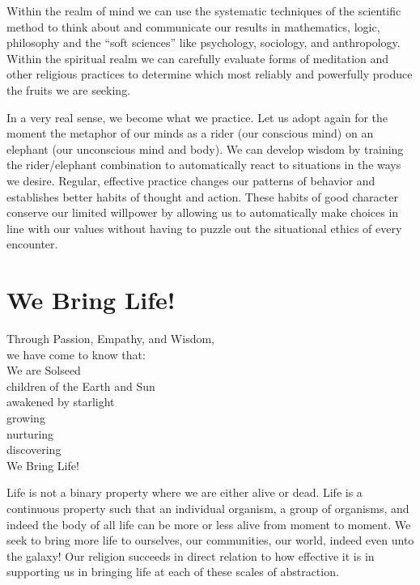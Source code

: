 \documentclass[ebook,12pt,openany,twoside]{memoir}
\newcommand{\tab}{\hspace*{2em}}
\newcommand{\imagefacingchapter}[1]{
  \cleartoverso
  \clearpage \null
  \thispagestyle{cleared}
  \AddToShipoutPictureBG*{%
    \AtStockLowerLeft{%
      \texttt{[image: \#1]}
    }
  }
  \clearpage
}
\begin{document}
Within the realm of mind we can use the systematic techniques of the scientific
method to think about and communicate our results in mathematics, logic,
philosophy and the ``soft sciences'' like psychology, sociology, and
anthropology. Within the spiritual realm we can carefully evaluate forms of
meditation and other religious practices to determine which most reliably and
powerfully produce the fruits we are seeking.

In a very real sense, we become what we practice. Let us adopt again for the
moment the metaphor of our minds as a rider (our conscious mind) on an elephant
(our unconscious mind and body). We can develop wisdom by training the
rider/elephant combination to automatically react to situations in the ways we
desire. Regular, effective practice changes our patterns of behavior and
establishes better habits of thought and action.  These habits of good character
conserve our limited willpower by allowing us to automatically make choices in
line with our values without having to puzzle out the situational ethics of
every encounter.




\imagefacingchapter{images/WeBringLife}
\chapter{We Bring Life!}
\setlength\epigraphwidth{2.8in}
\epigraph{
  Through Passion, Empathy, and Wisdom,\\
  we have come to know that:\\
  \tab We are Solseed\\
  \tab children of the Earth and Sun\\
  \tab awakened by starlight\\
  \tab growing\\
  \tab nurturing\\
  \tab discovering\\
  \tab We Bring Life!
}{}

Life is not a binary property where we are either alive or dead. Life is a
continuous property such that an individual organism, a group of organisms, and
indeed the body of all life can be more or less alive from moment to moment. We
seek to bring more life to ourselves, our communities, our world, indeed even
unto the galaxy! Our religion succeeds in direct relation to how effective it
is in supporting us in bringing life at each of these scales of abstraction.

\newpage

\theendnotes

{}

\end{document}
